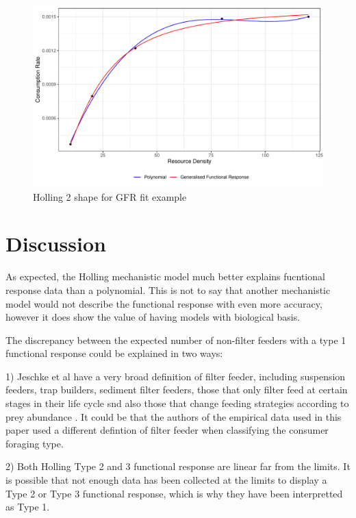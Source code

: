 \documentclass[11pt, a4paper, titlepage]{article}
\begin{document}
\begin{figure}[ht!]
	\centering\includegraphics[width=1\textwidth]{../Results/GFR_Holling2_example.pdf}
	\caption{Holling 2 shape for GFR fit example}
\end{figure}

\section{Discussion}

As expected, the Holling mechanistic model much better explains fucntional response data than a polynomial. This is not to say that another mechanistic model would not describe the functional response with even more accuracy, however it does show the value of having models with biological basis.

The discrepancy between the expected number of non-filter feeders with a type 1 functional response could be explained in two ways:

1) Jeschke et al have a very broad definition of filter feeder, including suspension feeders, trap builders, sediment filter feeders, those that only filter feed at certain stages in their life cycle snd also those that change feeding strategies according to prey abundance \parencite{Jeschke2004}. It could be that the authors of the empirical data used in this paper used a different defintion of filter feeder when classifying the consumer foraging type.

2) Both Holling Type 2 and 3 functional response are linear far from the limits. It is possible that not enough data has been collected at the limits to display a Type 2 or Type 3 functional response, which is why they have been interpretted as Type 1.
\end{document}
